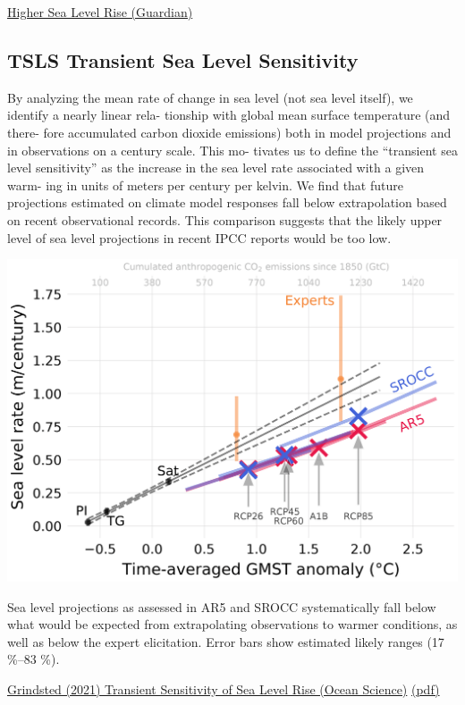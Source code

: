 \documentclass[
]{book}
\begin{document}
\href{https://www.theguardian.com/environment/2021/feb/02/sea-level-rise-could-be-worse-than-feared-warn-researchers}{Higher Sea Level Rise (Guardian)}

\hypertarget{tsls-transient-sea-level-sensitivity}{%
\subsection{TSLS Transient Sea Level Sensitivity}\label{tsls-transient-sea-level-sensitivity}}

By analyzing the mean rate of change in sea
level (not sea level itself), we identify a nearly linear rela-
tionship with global mean surface temperature (and there-
fore accumulated carbon dioxide emissions) both in model
projections and in observations on a century scale. This mo-
tivates us to define the ``transient sea level sensitivity'' as the
increase in the sea level rate associated with a given warm-
ing in units of meters per century per kelvin. We find that
future projections estimated on climate model responses fall
below extrapolation based on recent observational records.
This comparison suggests that the likely upper level of sea
level projections in recent IPCC reports would be too low.

\includegraphics{fig/Transient_Sea_Level_Sensitivity.png}

Sea level projections as assessed in AR5 and SROCC systematically fall
below what would be expected from extrapolating observations to
warmer conditions, as well as below the expert elicitation. Error
bars show estimated likely ranges (17 \%--83 \%).

\href{https://os.copernicus.org/articles/17/181/2021/}{Grindsted (2021) Transient Sensitivity of Sea Level Rise (Ocean Science)}
\href{pdf/Grindsted_2021_Transient_Sensitivity_of_Sea_Level_Rise.pdf}{(pdf)}
\end{document}

